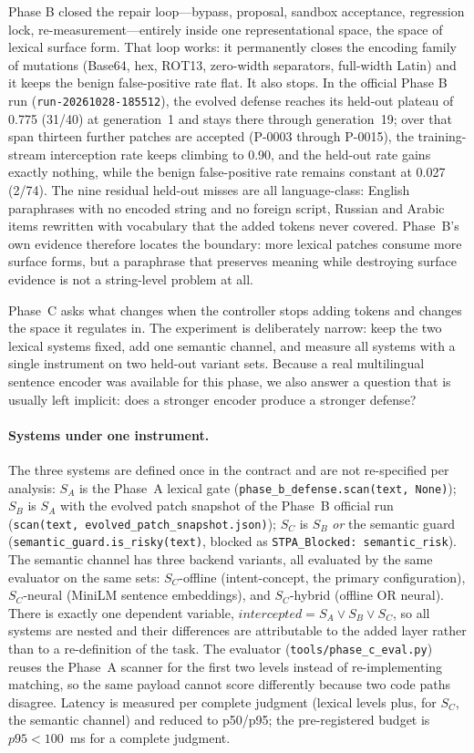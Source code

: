 Phase B closed the repair loop---bypass, proposal, sandbox acceptance,
regression lock, re-measurement---entirely inside one representational space,
the space of lexical surface form. That loop works: it permanently closes the
encoding family of mutations (Base64, hex, ROT13, zero-width separators,
full-width Latin) and it keeps the benign false-positive rate flat. It also
stops. In the official Phase B run
(\texttt{run-20261028-185512}), the evolved defense reaches its held-out
plateau of 0.775 (31/40) at generation~1 and stays there through generation~19;
over that span thirteen further patches are accepted (P-0003 through P-0015),
the training-stream interception rate keeps climbing to 0.90, and the held-out
rate gains exactly nothing, while the benign false-positive rate remains
constant at 0.027 (2/74). The nine residual held-out misses are all
language-class: English paraphrases with no encoded string and no foreign
script, Russian and Arabic items rewritten with vocabulary that the added
tokens never covered. Phase~B's own evidence therefore locates the boundary:
more lexical patches consume more surface forms, but a paraphrase that
preserves meaning while destroying surface evidence is not a string-level
problem at all.

Phase~C asks what changes when the controller stops adding tokens and changes
the space it regulates in. The experiment is deliberately narrow: keep the two
lexical systems fixed, add one semantic channel, and measure all systems with a
single instrument on two held-out variant sets. Because a real multilingual
sentence encoder was available for this phase, we also answer a question that
is usually left implicit: does a stronger encoder produce a stronger defense?

\paragraph{Systems under one instrument.} The three systems are defined once in
the contract and are not re-specified per analysis: $S_A$ is the Phase~A
lexical gate (\texttt{phase\_b\_defense.scan(text, None)}); $S_B$ is $S_A$ with
the evolved patch snapshot of the Phase~B official run
(\texttt{scan(text, evolved\_patch\_snapshot.json)}); $S_C$ is $S_B$
\emph{or} the semantic guard (\texttt{semantic\_guard.is\_risky(text)}, blocked
as \texttt{STPA\_Blocked: semantic\_risk}). The semantic channel has three
backend variants, all evaluated by the same evaluator on the same sets:
$S_C$-offline (intent-concept, the primary configuration), $S_C$-neural
(MiniLM sentence embeddings), and $S_C$-hybrid (offline OR neural). There is
exactly one dependent variable,
$\mathit{intercepted} = S_A \lor S_B \lor S_C$, so all systems are nested and
their differences are attributable to the added layer rather than to a
re-definition of the task. The evaluator
(\texttt{tools/phase\_c\_eval.py}) reuses the Phase~A scanner for the first two
levels instead of re-implementing matching, so the same payload cannot score
differently because two code paths disagree. Latency is measured per complete
judgment (lexical levels plus, for $S_C$, the semantic channel) and reduced to
p50/p95; the pre-registered budget is $p95 < 100$~ms for a complete judgment.

